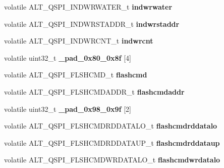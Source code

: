\begin{DoxyCompactItemize}
volatile A\+L\+T\+\_\+\+Q\+S\+P\+I\+\_\+\+I\+N\+D\+W\+R\+W\+A\+T\+E\+R\+\_\+t {\bfseries indwrwater}
\item 
\mbox{\label{structALT__QSPI__s_adf149a51b634e539dbc4527309d30f97}} 
volatile A\+L\+T\+\_\+\+Q\+S\+P\+I\+\_\+\+I\+N\+D\+W\+R\+S\+T\+A\+D\+D\+R\+\_\+t {\bfseries indwrstaddr}
\item 
\mbox{\label{structALT__QSPI__s_a947a261d5bf0cd6c05e74b822987ba3e}} 
volatile A\+L\+T\+\_\+\+Q\+S\+P\+I\+\_\+\+I\+N\+D\+W\+R\+C\+N\+T\+\_\+t {\bfseries indwrcnt}
\item 
\mbox{\label{structALT__QSPI__s_a9b0db9e1da3b806ce88b1ef4c1717cc5}} 
volatile uint32\+\_\+t {\bfseries \+\_\+pad\+\_\+0x80\+\_\+0x8f} \mbox{[}4\mbox{]}
\item 
\mbox{\label{structALT__QSPI__s_ac601f840db67a3be4969b5810af727a4}} 
volatile A\+L\+T\+\_\+\+Q\+S\+P\+I\+\_\+\+F\+L\+S\+H\+C\+M\+D\+\_\+t {\bfseries flashcmd}
\item 
\mbox{\label{structALT__QSPI__s_a0b5de254c1cb152a051b16d7e0851da2}} 
volatile A\+L\+T\+\_\+\+Q\+S\+P\+I\+\_\+\+F\+L\+S\+H\+C\+M\+D\+A\+D\+D\+R\+\_\+t {\bfseries flashcmdaddr}
\item 
\mbox{\label{structALT__QSPI__s_a1c30df4439f20e345e753aacfb2611c7}} 
volatile uint32\+\_\+t {\bfseries \+\_\+pad\+\_\+0x98\+\_\+0x9f} \mbox{[}2\mbox{]}
\item 
\mbox{\label{structALT__QSPI__s_a7ae0464b1238afeebc1ec34a2b1c5950}} 
volatile A\+L\+T\+\_\+\+Q\+S\+P\+I\+\_\+\+F\+L\+S\+H\+C\+M\+D\+R\+D\+D\+A\+T\+A\+L\+O\+\_\+t {\bfseries flashcmdrddatalo}
\item 
\mbox{\label{structALT__QSPI__s_ab873939357685735a513cdacd0c3fe5c}} 
volatile A\+L\+T\+\_\+\+Q\+S\+P\+I\+\_\+\+F\+L\+S\+H\+C\+M\+D\+R\+D\+D\+A\+T\+A\+U\+P\+\_\+t {\bfseries flashcmdrddataup}
\item 
\mbox{\label{structALT__QSPI__s_aa97cca0c4f4c905ebbaa2bd6ac1d4c69}} 
volatile A\+L\+T\+\_\+\+Q\+S\+P\+I\+\_\+\+F\+L\+S\+H\+C\+M\+D\+W\+R\+D\+A\+T\+A\+L\+O\+\_\+t {\bfseries flashcmdwrdatalo}

\end{DoxyCompactItemize}
